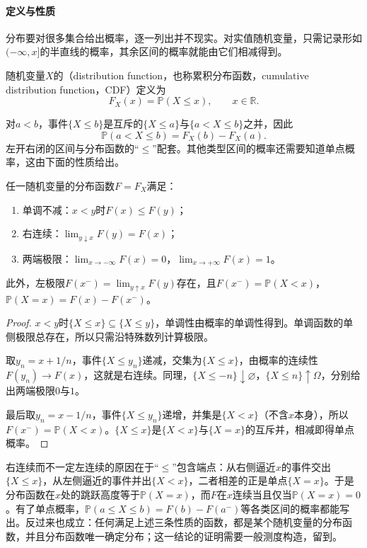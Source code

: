 \paragraph{定义与性质}
分布要对很多集合给出概率，逐一列出并不现实。对实值随机变量，只需记录形如$(-\infty,x]$的半直线的概率，其余区间的概率就能由它们相减得到。

\begin{definition}[分布函数]
\label{def:prob-cdf}
随机变量$X$的（distribution function，也称累积分布函数，cumulative distribution function，CDF）定义为
\[
  F_X(x)=\mathbb{P}(X\leq x),\qquad x\in\mathbb{R}.
\]
\end{definition}

对$a<b$，事件$\{X\leq b\}$是互斥的$\{X\leq a\}$与$\{a<X\leq b\}$之并，因此
\[
  \mathbb{P}(a<X\leq b)=F_X(b)-F_X(a).
\]
左开右闭的区间与分布函数的“$\leq$”配套。其他类型区间的概率还需要知道单点概率，这由下面的性质给出。

\begin{theorem}[分布函数的性质]
\label{thm:prob-cdf-properties}
任一随机变量的分布函数$F=F_X$满足：
\begin{enumerate}
  \item 单调不减：$x<y$时$F(x)\leq F(y)$；
  \item 右连续：$\lim_{y\downarrow x}F(y)=F(x)$；
  \item 两端极限：$\lim_{x\to-\infty}F(x)=0$，$\lim_{x\to+\infty}F(x)=1$。
\end{enumerate}
此外，左极限$F(x^-)=\lim_{y\uparrow x}F(y)$存在，且$F(x^-)=\mathbb{P}(X<x)$，$\mathbb{P}(X=x)=F(x)-F(x^-)$。
\end{theorem}
\begin{proof}
$x<y$时$\{X\leq x\}\subseteq\{X\leq y\}$，单调性由概率的单调性得到。单调函数的单侧极限总存在，所以只需沿特殊数列计算极限。

取$y_n=x+1/n$，事件$\{X\leq y_n\}$递减，交集为$\{X\leq x\}$，由概率的连续性$F(y_n)\to F(x)$，这就是右连续。同理，$\{X\leq -n\}\downarrow\varnothing$，$\{X\leq n\}\uparrow\Omega$，分别给出两端极限$0$与$1$。

最后取$y_n=x-1/n$，事件$\{X\leq y_n\}$递增，并集是$\{X<x\}$（不含$x$本身），所以$F(x^-)=\mathbb{P}(X<x)$。$\{X\leq x\}$是$\{X<x\}$与$\{X=x\}$的互斥并，相减即得单点概率。
\end{proof}

右连续而不一定左连续的原因在于“$\leq$”包含端点：从右侧逼近$x$的事件交出$\{X\leq x\}$，从左侧逼近的事件并出$\{X<x\}$，二者相差的正是单点$\{X=x\}$。于是分布函数在$x$处的跳跃高度等于$\mathbb{P}(X=x)$，而$F$在$x$连续当且仅当$\mathbb{P}(X=x)=0$。有了单点概率，$\mathbb{P}(a\leq X\leq b)=F(b)-F(a^-)$等各类区间的概率都能写出。反过来也成立：任何满足上述三条性质的函数，都是某个随机变量的分布函数，并且分布函数唯一确定分布；这一结论的证明需要一般测度构造，留到。

